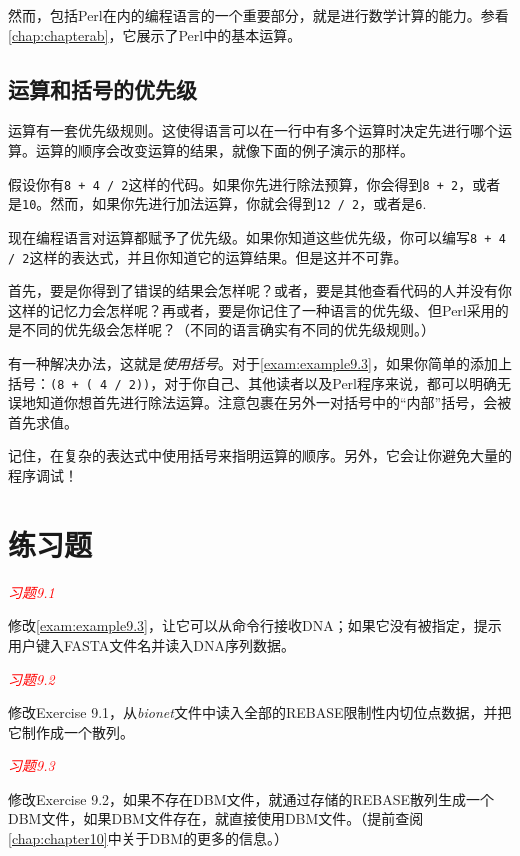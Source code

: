 然而，包括Perl在内的编程语言的一个重要部分，就是进行数学计算的能力。参看\autoref{chap:chapterab}，它展示了Perl中的基本运算。

\subsection{运算和括号的优先级}
\label{sect:section9.3.1}
运算有一套优先级规则。这使得语言可以在一行中有多个运算时决定先进行哪个运算。运算的顺序会改变运算的结果，就像下面的例子演示的那样。

假设你有\verb|8 + 4 / 2|这样的代码。如果你先进行除法预算，你会得到\verb|8 + 2|，或者是\verb|10|。然而，如果你先进行加法运算，你就会得到\verb|12 / 2|，或者是\verb|6|.

现在编程语言对运算都赋予了优先级。如果你知道这些优先级，你可以编写\verb|8 + 4 / 2|这样的表达式，并且你知道它的运算结果。但是这并不可靠。

首先，要是你得到了错误的结果会怎样呢？或者，要是其他查看代码的人并没有你这样的记忆力会怎样呢？再或者，要是你记住了一种语言的优先级、但Perl采用的是不同的优先级会怎样呢？（不同的语言确实有不同的优先级规则。）

有一种解决办法，这就是\textit{使用括号}。对于\autoref{exam:example9.3}，如果你简单的添加上括号：\verb|(8 + ( 4 / 2))|，对于你自己、其他读者以及Perl程序来说，都可以明确无误地知道你想首先进行除法运算。注意包裹在另外一对括号中的“内部”括号，会被首先求值。

记住，在复杂的表达式中使用括号来指明运算的顺序。另外，它会让你避免大量的程序调试！

\section{练习题}
\label{sect:section9.4}
\textcolor{red}{\textit{习题9.1}}
\begin{adjustwidth}{2em}{}
修改\autoref{exam:example9.3}，让它可以从命令行接收DNA；如果它没有被指定，提示用户键入FASTA文件名并读入DNA序列数据。
\end{adjustwidth}

\textcolor{red}{\textit{习题9.2}}
\begin{adjustwidth}{2em}{}
  修改Exercise
  9.1，从\textit{bionet}文件中读入全部的REBASE限制性内切位点数据，并把它制作成一个散列。
\end{adjustwidth}

\textcolor{red}{\textit{习题9.3}}
\begin{adjustwidth}{2em}{}
修改Exercise 9.2，如果不存在DBM文件，就通过存储的REBASE散列生成一个DBM文件，如果DBM文件存在，就直接使用DBM文件。（提前查阅\autoref{chap:chapter10}中关于DBM的更多的信息。）
\end{adjustwidth}

